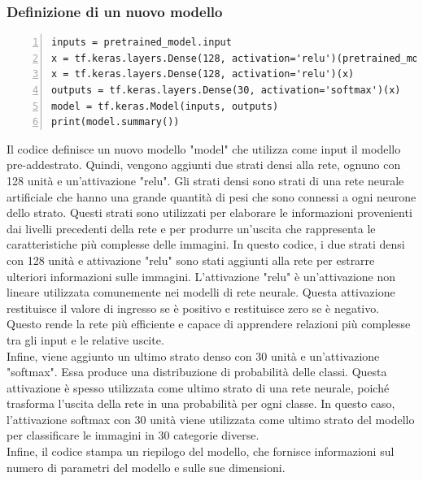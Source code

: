 \documentclass[a4paper,final,12pt]{report}
\begin{document}
\subsubsection{Definizione di un nuovo modello}
\begin{lstlisting}[caption={Aggiunta di due strati densi alla rete.}, label={lst:aggiunta_strati_densi}, breaklines, escapechar=`\%, frame=lines, basicstyle=\small\ttfamily, keepspaces=true, numbers=left]
inputs = pretrained_model.input
x = tf.keras.layers.Dense(128, activation='relu')(pretrained_model.output)
x = tf.keras.layers.Dense(128, activation='relu')(x)
outputs = tf.keras.layers.Dense(30, activation='softmax')(x)
model = tf.keras.Model(inputs, outputs)
print(model.summary())
\end{lstlisting}
Il codice definisce un nuovo modello "model" che utilizza come input il modello pre-addestrato. Quindi, vengono aggiunti due strati densi alla rete, ognuno con 128 unità e un'attivazione "relu". Gli strati densi sono strati di una rete neurale artificiale che hanno una grande quantità di pesi che sono connessi a ogni neurone dello strato. Questi strati sono utilizzati per elaborare le informazioni provenienti dai livelli precedenti della rete e per produrre un'uscita che rappresenta le caratteristiche più complesse delle immagini. In questo codice, i due strati densi con 128 unità e attivazione "relu" sono stati aggiunti alla rete per estrarre ulteriori informazioni sulle immagini. L'attivazione "relu" è un'attivazione non lineare utilizzata comunemente nei modelli di rete neurale. Questa attivazione restituisce il valore di ingresso se è positivo e restituisce zero se è negativo. Questo rende la rete più efficiente e capace di apprendere relazioni più complesse tra gli input e le relative uscite.\\
Infine, viene aggiunto un ultimo strato denso con 30 unità e un'attivazione "softmax". Essa produce una distribuzione di probabilità delle classi. Questa attivazione è spesso utilizzata come ultimo strato di una rete neurale, poiché trasforma l'uscita della rete in una probabilità per ogni classe. In questo caso, l'attivazione softmax con 30 unità viene utilizzata come ultimo strato del modello per classificare le immagini in 30 categorie diverse.\\
Infine, il codice stampa un riepilogo del modello, che fornisce informazioni sul numero di parametri del modello e sulle sue dimensioni.\\
\end{document}
